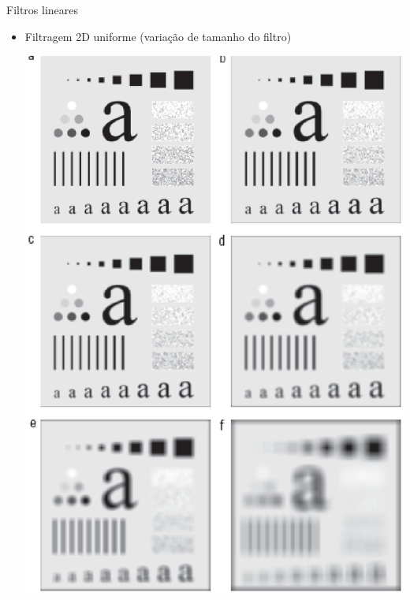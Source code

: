       \begin{slide}[toc=]{Filtros lineares}
      \begin{itemize}
       \item Filtragem 2D uniforme (variação de tamanho do filtro)
       \begin{center}
          \includegraphics[height=0.7\textheight]{figs/fig0333}
      \end{center}
      \end{itemize}
      \end{slide}
      
